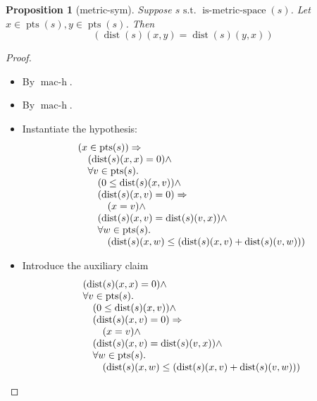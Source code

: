 \documentclass[11pt]{article}
\theoremstyle{plain}
\newtheorem{proposition}{Proposition}
\begin{document}
\begin{proposition}[metric-sym]
Suppose $s \text{ s.t. } \operatorname{is\text{-}metric\text{-}space}(s)$. Let $x \in \operatorname{pts}(s), y \in \operatorname{pts}(s)$. Then
\begin{equation*}
(\operatorname{dist}(s)(x, y) = \operatorname{dist}(s)(y, x))
\end{equation*}

\end{proposition}

\begin{proof}
\begin{itemize}[leftmargin=2.8em, itemsep=4pt, parsep=1pt]
  \item[\textbf{3}] By $\operatorname{mac\text{-}h}$.
  \item[\textbf{4--7}] By $\operatorname{mac\text{-}h}$.
  \item[\textbf{8--9}] Instantiate the hypothesis:
\begin{equation*}
\begin{array}{@{}l@{}} (x \in \operatorname{pts}(s)) \Rightarrow  \\ \quad (\operatorname{dist}(s)(x, x) = 0) \wedge \\ \quad \forall v \in \operatorname{pts}(s). \\ \quad \quad (0 \leq \operatorname{dist}(s)(x, v)) \wedge \\ \quad \quad (\operatorname{dist}(s)(x, v) = 0) \Rightarrow  \\ \quad \quad \quad (x = v) \wedge \\ \quad \quad (\operatorname{dist}(s)(x, v) = \operatorname{dist}(s)(v, x)) \wedge \\ \quad \quad \forall w \in \operatorname{pts}(s). \\ \quad \quad \quad (\operatorname{dist}(s)(x, w) \leq (\operatorname{dist}(s)(x, v) + \operatorname{dist}(s)(v, w))) \end{array}
\end{equation*}

  \item[\textbf{10}] Introduce the auxiliary claim
\begin{equation*}
\begin{array}{@{}l@{}} (\operatorname{dist}(s)(x, x) = 0) \wedge \\ \forall v \in \operatorname{pts}(s). \\ \quad (0 \leq \operatorname{dist}(s)(x, v)) \wedge \\ \quad (\operatorname{dist}(s)(x, v) = 0) \Rightarrow  \\ \quad \quad (x = v) \wedge \\ \quad (\operatorname{dist}(s)(x, v) = \operatorname{dist}(s)(v, x)) \wedge \\ \quad \forall w \in \operatorname{pts}(s). \\ \quad \quad (\operatorname{dist}(s)(x, w) \leq (\operatorname{dist}(s)(x, v) + \operatorname{dist}(s)(v, w))) \end{array}
\end{equation*}


\end{itemize}
\end{proof}
\end{document}
